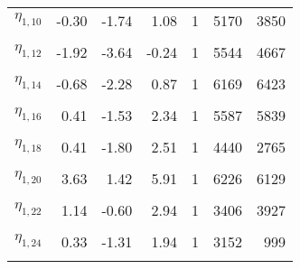 \begin{table}
\begin{tabular}[t]{lrrrrrr}
$\eta_{1, 10}$ & -0.30 & -1.74 & 1.08 & 1 & 5170 & 3850\\
\cellcolor{gray!6}{$\eta_{1, 11}$} & \cellcolor{gray!6}{-0.80} & \cellcolor{gray!6}{-2.14} & \cellcolor{gray!6}{0.52} & \cellcolor{gray!6}{1} & \cellcolor{gray!6}{6749} & \cellcolor{gray!6}{6049}\\
$\eta_{1, 12}$ & -1.92 & -3.64 & -0.24 & 1 & 5544 & 4667\\
\cellcolor{gray!6}{$\eta_{1, 13}$} & \cellcolor{gray!6}{1.18} & \cellcolor{gray!6}{-0.23} & \cellcolor{gray!6}{2.60} & \cellcolor{gray!6}{1} & \cellcolor{gray!6}{5849} & \cellcolor{gray!6}{6540}\\
$\eta_{1, 14}$ & -0.68 & -2.28 & 0.87 & 1 & 6169 & 6423\\
\cellcolor{gray!6}{$\eta_{1, 15}$} & \cellcolor{gray!6}{-0.07} & \cellcolor{gray!6}{-2.41} & \cellcolor{gray!6}{2.17} & \cellcolor{gray!6}{1} & \cellcolor{gray!6}{4753} & \cellcolor{gray!6}{2838}\\
$\eta_{1, 16}$ & 0.41 & -1.53 & 2.34 & 1 & 5587 & 5839\\
\cellcolor{gray!6}{$\eta_{1, 17}$} & \cellcolor{gray!6}{1.38} & \cellcolor{gray!6}{-0.30} & \cellcolor{gray!6}{3.09} & \cellcolor{gray!6}{1} & \cellcolor{gray!6}{4983} & \cellcolor{gray!6}{4322}\\
$\eta_{1, 18}$ & 0.41 & -1.80 & 2.51 & 1 & 4440 & 2765\\
\cellcolor{gray!6}{$\eta_{1, 19}$} & \cellcolor{gray!6}{1.77} & \cellcolor{gray!6}{0.08} & \cellcolor{gray!6}{3.46} & \cellcolor{gray!6}{1} & \cellcolor{gray!6}{4727} & \cellcolor{gray!6}{1324}\\
$\eta_{1, 20}$ & 3.63 & 1.42 & 5.91 & 1 & 6226 & 6129\\
\cellcolor{gray!6}{$\eta_{1, 21}$} & \cellcolor{gray!6}{-0.28} & \cellcolor{gray!6}{-2.45} & \cellcolor{gray!6}{1.70} & \cellcolor{gray!6}{1} & \cellcolor{gray!6}{2908} & \cellcolor{gray!6}{894}\\
$\eta_{1, 22}$ & 1.14 & -0.60 & 2.94 & 1 & 3406 & 3927\\
\cellcolor{gray!6}{$\eta_{1, 23}$} & \cellcolor{gray!6}{1.29} & \cellcolor{gray!6}{-0.65} & \cellcolor{gray!6}{3.30} & \cellcolor{gray!6}{1} & \cellcolor{gray!6}{4513} & \cellcolor{gray!6}{3859}\\
$\eta_{1, 24}$ & 0.33 & -1.31 & 1.94 & 1 & 3152 & 999\\
\cellcolor{gray!6}{$\eta_{1, 25}$} & \cellcolor{gray!6}{1.55} & \cellcolor{gray!6}{-0.39} & \cellcolor{gray!6}{3.61} & \cellcolor{gray!6}{1} & \cellcolor{gray!6}{4672} & \cellcolor{gray!6}{3593}\\

\end{tabular}
\end{table}
